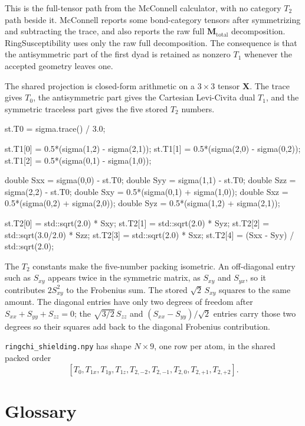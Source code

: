 \documentclass[11pt]{article}
\newcommand{\code}[1]{\texttt{#1}}
\begin{document}
This is the full-tensor path from the McConnell calculator, with no category
\(T_2\) path beside it. McConnell reports some bond-category tensors after
symmetrizing and subtracting the trace, and also reports the raw full
\(\bm M_{\mathrm{total}}\) decomposition. RingSusceptibility uses only the raw
full decomposition. The consequence is that the antisymmetric part of the first
dyad is retained as nonzero \(T_1\) whenever the accepted geometry leaves one.

The shared projection is closed-form arithmetic on a \(3\times3\) tensor
\(\bm X\). The trace gives \(T_0\), the antisymmetric part gives the Cartesian
Levi-Civita dual \(T_1\), and the symmetric traceless part gives the five
stored \(T_2\) numbers.

\begin{codebox}
st.T0 = sigma.trace() / 3.0;

st.T1[0] = 0.5*(sigma(1,2) - sigma(2,1));
st.T1[1] = 0.5*(sigma(2,0) - sigma(0,2));
st.T1[2] = 0.5*(sigma(0,1) - sigma(1,0));

double Sxx = sigma(0,0) - st.T0;
double Syy = sigma(1,1) - st.T0;
double Szz = sigma(2,2) - st.T0;
double Sxy = 0.5*(sigma(0,1) + sigma(1,0));
double Sxz = 0.5*(sigma(0,2) + sigma(2,0));
double Syz = 0.5*(sigma(1,2) + sigma(2,1));

st.T2[0] = std::sqrt(2.0) * Sxy;
st.T2[1] = std::sqrt(2.0) * Syz;
st.T2[2] = std::sqrt(3.0/2.0) * Szz;
st.T2[3] = std::sqrt(2.0) * Sxz;
st.T2[4] = (Sxx - Syy) / std::sqrt(2.0);
\end{codebox}

The \(T_2\) constants make the five-number packing isometric. An off-diagonal
entry such as \(S_{xy}\) appears twice in the symmetric matrix, as \(S_{xy}\)
and \(S_{yx}\), so it contributes \(2S_{xy}^2\) to the Frobenius sum. The
stored \(\sqrt2\,S_{xy}\) squares to the same amount. The diagonal entries have
only two degrees of freedom after \(S_{xx}+S_{yy}+S_{zz}=0\); the
\(\sqrt{3/2}\,S_{zz}\) and \((S_{xx}-S_{yy})/\sqrt2\) entries carry those two
degrees so their squares add back to the diagonal Frobenius contribution.

\code{ringchi\_shielding.npy} has shape \(N\times9\), one row per atom, in the
shared packed order
\[
  [T_0,T_{1x},T_{1y},T_{1z},
    T_{2,-2},T_{2,-1},T_{2,0},T_{2,+1},T_{2,+2}] .
\]

\section{Glossary}
\end{document}
